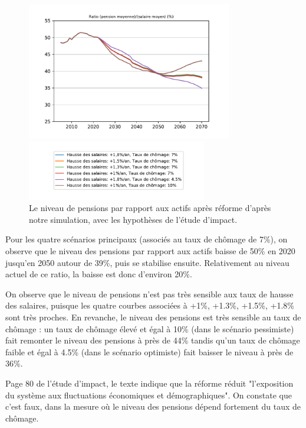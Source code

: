 \documentclass[10pt]{article}
\begin{document}
\begin{figure}
\begin{center}
\includegraphics[width=0.8\textwidth]{Simulation-P.pdf}

\includegraphics[width=0.7\textwidth]{Simulation-legende.pdf}
\end{center}

\caption{Le niveau de pensions par rapport aux actifs après réforme 
d'après notre simulation, avec les hypothèses de l'étude d'impact.}
\label{fig-simulation-P}
\end{figure}

Pour les quatre scénarios principaux (associés au taux de chômage 
de 7\%), on observe que le niveau des pensions par rapport aux actifs 
baisse de 50\% en 2020 jusqu'en 2050 autour de 39\%, puis se stabilise ensuite. 
Relativement au niveau actuel de ce ratio, la baisse est donc d'environ 20\%. 

On observe que le niveau de pensions n'est pas très sensible 
aux taux de hausse des salaires, puisque les quatre courbes associées 
à +1\%, +1.3\%, +1.5\%,  +1.8\% sont très proches. 
En revanche, le niveau des pensions est très sensible au taux de chômage : 
un taux de chômage élevé et égal à 10\% (dans le scénario pessimiste) 
fait remonter le niveau des pensions à près de 44\% tandis qu'un taux de 
chômage faible et égal à 4.5\% (dans le scénario optimiste) fait baisser 
le niveau à près de 36\%. 

Page 80 de l'étude d'impact, le texte indique que la réforme 
réduit "l’exposition du système aux fluctuations économiques et démographiques". 
On constate que c'est faux, dans la mesure où le niveau des pensions 
dépend fortement du taux de chômage.
\end{document}
